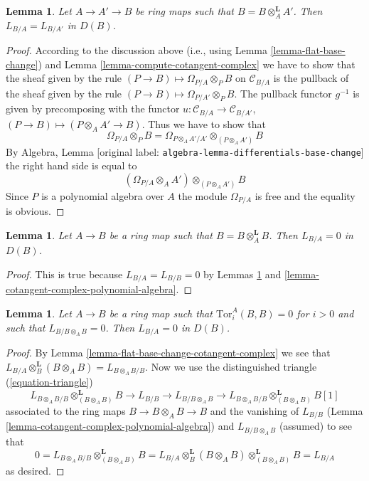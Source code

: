 \documentclass[10pt,a4paper]{article}
\theoremstyle{plain}
\newtheorem{lemma}[subsection]{Lemma}
\theoremstyle{definition}
\theoremstyle{remark}
\numberwithin{equation}{subsection}
\begin{document}
\begin{lemma}
\label{lemma-localize-at-bottom}
Let $A \to A' \to B$ be ring maps such that $B = B \otimes_A^\mathbf{L} A'$.
Then $L_{B/A} = L_{B/A'}$ in $D(B)$.
\end{lemma}

\begin{proof}
According to the discussion above (i.e., using
Lemma \ref{lemma-flat-base-change})
and Lemma \ref{lemma-compute-cotangent-complex}
we have to show that the sheaf given
by the rule $(P \to B) \mapsto \Omega_{P/A} \otimes_P B$ on $\mathcal{C}_{B/A}$
is the pullback of the sheaf given by the rule
$(P \to B) \mapsto \Omega_{P/A'} \otimes_P B$.
The pullback functor $g^{-1}$ is given by precomposing with the
functor $u : \mathcal{C}_{B/A} \to \mathcal{C}_{B/A'}$,
$(P \to B) \mapsto (P \otimes_A A' \to B)$.
Thus we have to show that
$$
\Omega_{P/A} \otimes_P B =
\Omega_{P \otimes_A A'/A'} \otimes_{(P \otimes_A A')} B
$$
By Algebra, Lemma \textnormal{[original label: \nolinkurl{algebra-lemma-differentials-base-change}]}
the right hand side is equal to
$$
(\Omega_{P/A} \otimes_A A') \otimes_{(P \otimes_A A')} B
$$
Since $P$ is a polynomial algebra over $A$ the module
$\Omega_{P/A}$ is free and the equality is obvious.
\end{proof}

\begin{lemma}
\label{lemma-derived-diagonal}
Let $A \to B$ be a ring map such that $B = B \otimes_A^\mathbf{L} B$.
Then $L_{B/A} = 0$ in $D(B)$.
\end{lemma}

\begin{proof}
This is true because $L_{B/A} = L_{B/B} = 0$ by
Lemmas \ref{lemma-localize-at-bottom} and
\ref{lemma-cotangent-complex-polynomial-algebra}.
\end{proof}

\begin{lemma}
\label{lemma-bootstrap}
Let $A \to B$ be a ring map such that $\text{Tor}^A_i(B, B) = 0$ for $i > 0$
and such that $L_{B/B \otimes_A B} = 0$.
Then $L_{B/A} = 0$ in $D(B)$.
\end{lemma}

\begin{proof}
By Lemma \ref{lemma-flat-base-change-cotangent-complex} we see that
$L_{B/A} \otimes_B^\mathbf{L} (B \otimes_A B) = L_{B \otimes_A B/B}$.
Now we use the distinguished triangle (\ref{equation-triangle})
$$
L_{B \otimes_A B/B} \otimes^\mathbf{L}_{(B \otimes_A B)} B \to
L_{B/B} \to L_{B/B \otimes_A B} \to
L_{B \otimes_A B/B} \otimes^\mathbf{L}_{(B \otimes_A B)} B[1]
$$
associated to the ring maps $B \to B \otimes_A B \to B$ and the vanishing of
$L_{B/B}$ (Lemma \ref{lemma-cotangent-complex-polynomial-algebra}) and
$L_{B/B \otimes_A B}$ (assumed) to see that
$$
0 =
L_{B \otimes_A B/B} \otimes^\mathbf{L}_{(B \otimes_A B)} B =
L_{B/A} \otimes_B^\mathbf{L} (B \otimes_A B)
\otimes^\mathbf{L}_{(B \otimes_A B)} B = L_{B/A}
$$
as desired.
\end{proof}
\end{document}

